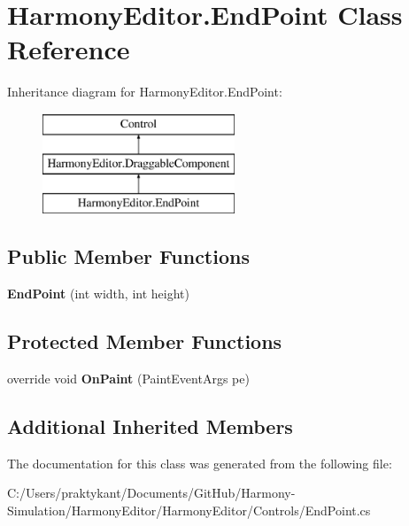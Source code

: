 \hypertarget{class_harmony_editor_1_1_end_point}{\section{Harmony\+Editor.\+End\+Point Class Reference}
\label{class_harmony_editor_1_1_end_point}
}
Inheritance diagram for Harmony\+Editor.\+End\+Point\+:\begin{figure}[H]
\begin{center}
\leavevmode
\includegraphics[height=3.000000cm]{class_harmony_editor_1_1_end_point}
\end{center}
\end{figure}
\subsection*{Public Member Functions}
\begin{DoxyCompactItemize}
\item 
\hypertarget{class_harmony_editor_1_1_end_point_a455c66b888889ee0285baf14e40195a6}{{\bfseries End\+Point} (int width, int height)}\label{class_harmony_editor_1_1_end_point_a455c66b888889ee0285baf14e40195a6}

\end{DoxyCompactItemize}
\subsection*{Protected Member Functions}
\begin{DoxyCompactItemize}
\item 
\hypertarget{class_harmony_editor_1_1_end_point_a2e12f6940c3b26e0d6d24420763454a6}{override void {\bfseries On\+Paint} (Paint\+Event\+Args pe)}\label{class_harmony_editor_1_1_end_point_a2e12f6940c3b26e0d6d24420763454a6}

\end{DoxyCompactItemize}
\subsection*{Additional Inherited Members}


The documentation for this class was generated from the following file\+:\begin{DoxyCompactItemize}
\item 
C\+:/\+Users/praktykant/\+Documents/\+Git\+Hub/\+Harmony-\/\+Simulation/\+Harmony\+Editor/\+Harmony\+Editor/\+Controls/End\+Point.\+cs\end{DoxyCompactItemize}
